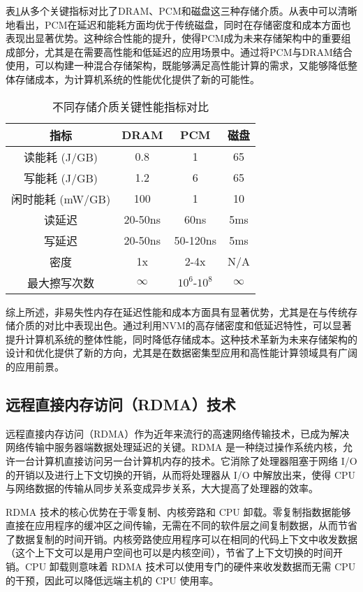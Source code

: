 表\ref{tab:storage_comparison}从多个关键指标对比了DRAM、PCM和磁盘这三种存储介质。从表中可以清晰地看出，PCM在延迟和能耗方面均优于传统磁盘，同时在存储密度和成本方面也表现出显著优势。这种综合性能的提升，使得PCM成为未来存储架构中的重要组成部分，尤其是在需要高性能和低延迟的应用场景中。通过将PCM与DRAM结合使用，可以构建一种混合存储架构，既能够满足高性能计算的需求，又能够降低整体存储成本，为计算机系统的性能优化提供了新的可能性。

\begin{table}[h]
    \centering
    \caption{不同存储介质关键性能指标对比}
    \label{tab:storage_comparison}
    \begin{tabular}{cccc}
    \toprule
    指标       & DRAM     & PCM      & 磁盘      \\
    \midrule
    读能耗 (J/GB) & 0.8      & 1        & 65       \\
    写能耗 (J/GB) & 1.2      & 6        & 65       \\
    闲时能耗 (mW/GB) & 100      & 1        & 10       \\
    读延迟     & 20-50ns   & 60ns      & 5ms       \\
    写延迟     & 20-50ns   & 50-120ns  & 5ms       \\
    密度       & 1x       & 2-4x     & N/A      \\
    最大擦写次数   & $\infty$ & $10^6$-$10^8$ & $\infty$ \\
    \bottomrule
    \end{tabular}
    \end{table}
综上所述，非易失性内存在延迟性能和成本方面具有显著优势，尤其是在与传统存储介质的对比中表现出色。通过利用NVM的高存储密度和低延迟特性，可以显著提升计算机系统的整体性能，同时降低存储成本。这种技术革新为未来存储架构的设计和优化提供了新的方向，尤其是在数据密集型应用和高性能计算领域具有广阔的应用前景。

\subsection{远程直接内存访问（RDMA）技术}

远程直接内存访问（RDMA）作为近年来流行的高速网络传输技术，已成为解决网络传输中服务器端数据处理延迟的关键。RDMA 是一种绕过操作系统内核，允许一台计算机直接访问另一台计算机内存的技术。它消除了处理器阻塞于网络 I/O 的开销以及进行上下文切换的开销，从而将处理器从 I/O 中解放出来，使得 CPU 与网络数据的传输从同步关系变成异步关系，大大提高了处理器的效率。

RDMA 技术的核心优势在于零复制、内核旁路和 CPU 卸载。零复制指数据能够直接在应用程序的缓冲区之间传输，无需在不同的软件层之间复制数据，从而节省了数据复制的时间开销。内核旁路使应用程序可以在相同的代码上下文中收发数据（这个上下文可以是用户空间也可以是内核空间），节省了上下文切换的时间开销。CPU 卸载则意味着 RDMA 技术可以使用专门的硬件来收发数据而无需 CPU 的干预，因此可以降低远端主机的 CPU 使用率。


